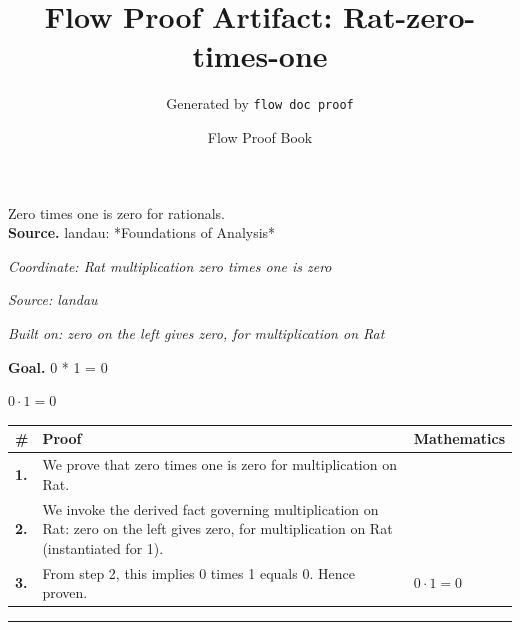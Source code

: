 \documentclass[11pt]{article}
\title{Flow Proof Artifact: Rat-zero-times-one}
\author{Generated by \texttt{flow doc proof}}
\date{Flow Proof Book}
\theoremstyle{definition}
\begin{document}
\maketitle
Zero times one is zero for rationals.\\[0.5em]
\textbf{Source.} landau: *Foundations of Analysis*\\[0.5em]
\bigskip
{}\par
\smallskip\noindent\textit{Coordinate: Rat \cdot multiplication \cdot zero times one is zero}\par
\smallskip\noindent\textit{Source: landau}\par
\smallskip\noindent\textit{Built on: zero on the left gives zero, for multiplication on Rat}\par
\medskip
\noindent\textbf{Goal.} 0 * 1 = 0\par
\noindent$\displaystyle 0 \cdot 1 = 0$\par
\medskip
\noindent
\begin{tabular}{@{} >{\raggedright\arraybackslash}p{} >{\raggedright\arraybackslash}p{} >{\raggedleft\arraybackslash}p{} @{}}
\textbf{\#} & \textbf{Proof} & \textbf{Mathematics} \\
\midrule
\textbf{1.} & We prove that zero times one is zero for multiplication on Rat. & \\[0.45em]
\textbf{2.} & We invoke the derived fact governing multiplication on Rat: zero on the left gives zero, for multiplication on Rat (instantiated for 1). & \\[0.45em]
\textbf{3.} & From step 2, this implies 0 times 1 equals 0. Hence proven. & $\displaystyle 0 \cdot 1 = 0$ \\[0.45em]
\bottomrule
\end{tabular}
\label{thm:Rat-multiplication-zero_times_one_is_zero}
\par\medskip\hrule
\end{document}
